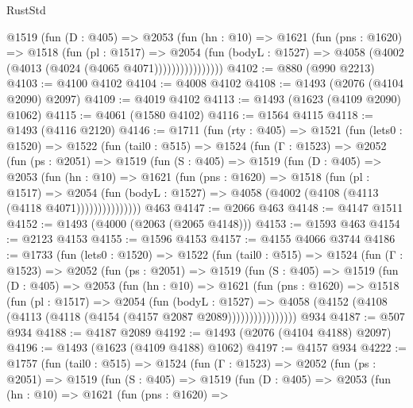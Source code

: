 \begin{lexlean}{RustStd}
\begin{coremodule}
                @1519
                  (fun (D : @405) =>
                  @2053
                    (fun (hn : @10) =>
                    @1621
                      (fun (pns : @1620) =>
                      @1518
                        (fun (pl : @1517) =>
                        @2054
                          (fun (bodyL : @1527) =>
                          @4058 (@4002 (@4013 (@4024 (@4065 @4071))))))))))))))))
@4102 := @880 (@990 @2213)
@4103 := @4100 @4102
@4104 := @4008 @4102
@4108 := @1493 (@2076 (@4104 @2090) @2097)
@4109 := @4019 @4102
@4113 := @1493 (@1623 (@4109 @2090) @1062)
@4115 := @4061 (@1580 @4102)
@4116 := @1564 @4115
@4118 := @1493 (@4116 @2120)
@4146 := @1711
    (fun (rty : @405) =>
    @1521
      (fun (lets0 : @1520) =>
      @1522
        (fun (tail0 : @515) =>
        @1524
          (fun (Γ : @1523) =>
          @2052
            (fun (ps : @2051) =>
            @1519
              (fun (S : @405) =>
              @1519
                (fun (D : @405) =>
                @2053
                  (fun (hn : @10) =>
                  @1621
                    (fun (pns : @1620) =>
                    @1518
                      (fun (pl : @1517) =>
                      @2054
                        (fun (bodyL : @1527) =>
                        @4058 (@4002 (@4108 (@4113 (@4118 @4071)))))))))))))))
    @463
@4147 := @2066 @463
@4148 := @4147 @1511
@4152 := @1493 (@4000 (@2063 (@2065 @4148)))
@4153 := @1593 @463
@4154 := @2123 @4153
@4155 := @1596 @4153
@4157 := @4155 @4066 @3744
@4186 := @1733
    (fun (lets0 : @1520) =>
    @1522
      (fun (tail0 : @515) =>
      @1524
        (fun (Γ : @1523) =>
        @2052
          (fun (ps : @2051) =>
          @1519
            (fun (S : @405) =>
            @1519
              (fun (D : @405) =>
              @2053
                (fun (hn : @10) =>
                @1621
                  (fun (pns : @1620) =>
                  @1518
                    (fun (pl : @1517) =>
                    @2054
                      (fun (bodyL : @1527) =>
                      @4058 (@4152 (@4108 (@4113 (@4118 (@4154 (@4157 @2087 @2089))))))))))))))))
    @934
@4187 := @507 @934
@4188 := @4187 @2089
@4192 := @1493 (@2076 (@4104 @4188) @2097)
@4196 := @1493 (@1623 (@4109 @4188) @1062)
@4197 := @4157 @934
@4222 := @1757
    (fun (tail0 : @515) =>
    @1524
      (fun (Γ : @1523) =>
      @2052
        (fun (ps : @2051) =>
        @1519
          (fun (S : @405) =>
          @1519
            (fun (D : @405) =>
            @2053
              (fun (hn : @10) =>
              @1621
                (fun (pns : @1620) =>

\end{coremodule}
\end{lexlean}
